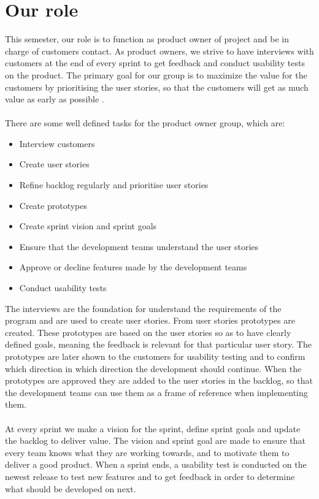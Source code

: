 \section{Our role}
This semester, our role is to function as product owner of project and be in charge of customers contact.
As product owners, we strive to have interviews with customers at the end of every sprint to get feedback and conduct usability tests on the product.
The primary goal for our group is to maximize the value for the customers by prioritising the user stories, so that the customers will get as much value as early as possible \autocite{TheScrumGuide}.\\
\\
There are some well defined tasks for the product owner group, which are:
\begin{itemize}
    \item Interview customers
    \item Create user stories    
    \item Refine backlog regularly and prioritise user stories
    \item Create prototypes
    \item Create sprint vision and sprint goals
    \item Ensure that the development teams understand the user stories
    \item Approve or decline features made by the development teams
    \item Conduct usability tests
\end{itemize}
\noindent
The interviews are the foundation for understand the requirements of the program and are used to create user stories. 
From user stories prototypes are created.
These prototypes are based on the user stories so as to have clearly defined goals, meaning the feedback is relevant for that particular user story.
The prototypes are later shown to the customers for usability testing and to confirm which direction in which direction the development should continue.
When the prototypes are approved they are added to the user stories in the backlog, so that the development teams can use them as a frame of reference when implementing them.
\\\\
At every sprint we make a vision for the sprint, define sprint goals and update the backlog to deliver value. 
The vision and sprint goal are made to ensure that every team knows what they are working towards, and to motivate them to deliver a good product.
When a sprint ends, a usability test is conducted on the newest release to test new features and to get feedback in order to determine what should be developed on next.
